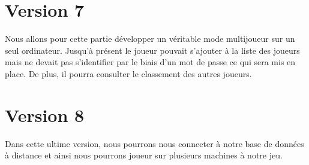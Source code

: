 \section{Version 7}
Nous allons pour cette partie développer un véritable mode multijoueur sur un seul ordinateur. Jusqu'à présent le joueur pouvait s'ajouter à la liste des joueurs mais ne devait pas s'identifier par le biais d'un mot de passe ce qui sera mis en place. De plus, il pourra consulter le classement des autres joueurs. 

\section{Version 8}
Dans cette ultime version, nous pourrons nous connecter à notre base de données à distance et ainsi nous pourrons joueur sur plusieurs machines à notre jeu. 